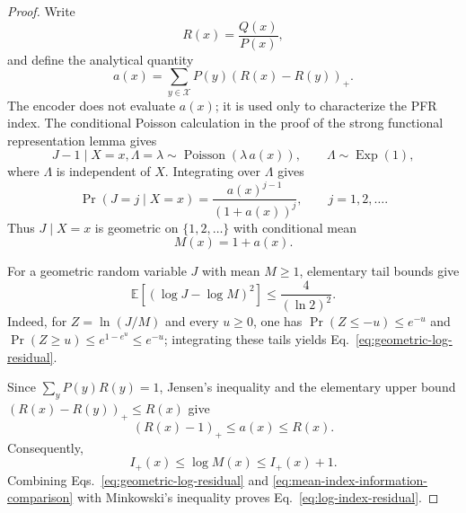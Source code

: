 \documentclass{article}
\theoremstyle{plain}
\theoremstyle{definition}
\theoremstyle{remark}
\begin{document}
\begin{proof}
Write
\begin{equation}
    R(x)
    =
    \frac{Q(x)}{P(x)},
\end{equation}
and define the analytical quantity
\begin{equation}
    a(x)
    =
    \sum_{y\in\mathcal X}
    P(y)\left(R(x)-R(y)\right)_+.
    \label{eq:analytical-a}
\end{equation}
The encoder does not evaluate $a(x)$; it is used only to characterize the PFR index. The conditional Poisson calculation in the proof of the strong functional representation lemma gives
\begin{equation}
    J-1
    \mid
    X=x,\Lambda=\lambda
    \sim
    \operatorname{Poisson}(\lambda\, a(x)),
    \qquad
    \Lambda\sim\operatorname{Exp}(1),
\end{equation}
where $\Lambda$ is independent of $X$. Integrating over $\Lambda$ gives
\begin{equation}
    \Pr(J=j\mid X=x)
    =
    \frac{a(x)^{j-1}}{(1+a(x))^j},
    \qquad
    j=1,2,\ldots.
    \label{eq:conditional-geometric}
\end{equation}
Thus $J\mid X=x$ is geometric on $\{1,2,\ldots\}$ with conditional mean
\begin{equation}
    M(x)
    =
    1+a(x).
\end{equation}

For a geometric random variable $J$ with mean $M\geq1$, elementary tail bounds give
\begin{equation}
    \mathbb E\left[
      \left(\log J-\log M\right)^2
    \right]
    \leq
    \frac{4}{(\ln 2)^2}.
    \label{eq:geometric-log-residual}
\end{equation}
Indeed, for $Z=\ln(J/M)$ and every $u\geq0$, one has $\Pr(Z\leq-u)\leq e^{-u}$ and $\Pr(Z\geq u)\leq e^{1-e^u}\leq e^{-u}$; integrating these tails yields Eq.~\eqref{eq:geometric-log-residual}.

Since $\sum_yP(y)R(y)=1$, Jensen's inequality and the elementary upper bound $(R(x)-R(y))_+\leq R(x)$ give
\begin{equation}
    (R(x)-1)_+
    \leq
    a(x)
    \leq
    R(x).
\end{equation}
Consequently,
\begin{equation}
    I_+(x)
    \leq
    \log M(x)
    \leq
    I_+(x)+1.
    \label{eq:mean-index-information-comparison}
\end{equation}
Combining Eqs.~\eqref{eq:geometric-log-residual} and \eqref{eq:mean-index-information-comparison} with Minkowski's inequality proves Eq.~\eqref{eq:log-index-residual}.


\end{proof}
\end{document}

